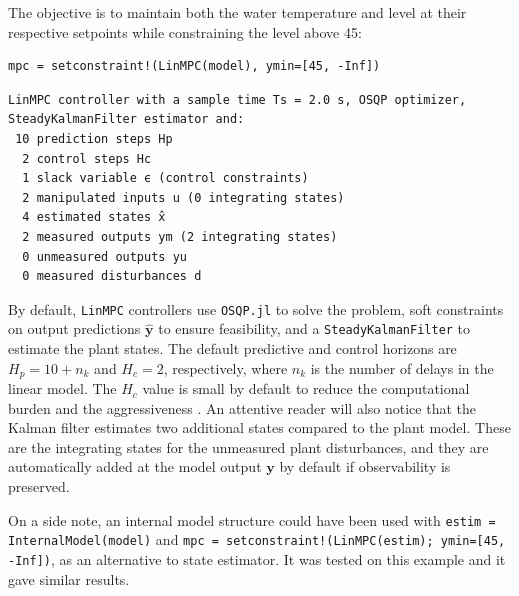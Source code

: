The objective is to maintain both the water temperature and level at their respective setpoints while constraining the level above 45:
\begin{verbatim}
mpc = setconstraint!(LinMPC(model), ymin=[45, -Inf])
\end{verbatim}
\spacerepl
\begin{verbatim}
LinMPC controller with a sample time Ts = 2.0 s, OSQP optimizer, SteadyKalmanFilter estimator and:
 10 prediction steps Hp
  2 control steps Hc
  1 slack variable ϵ (control constraints)
  2 manipulated inputs u (0 integrating states)
  4 estimated states x̂
  2 measured outputs ym (2 integrating states)
  0 unmeasured outputs yu
  0 measured disturbances d
\end{verbatim}
By default, \texttt{LinMPC} controllers use \texttt{OSQP.jl} \citep{osqp} to solve the problem, soft constraints on output predictions $\mathbf{\hat y}$ to ensure feasibility, and a \texttt{SteadyKalmanFilter} to estimate the plant states. The default predictive and control horizons are $H_p = 10 + n_k$ and $H_c = 2$, respectively, where $n_k$ is the number of delays in the linear model. The $H_c$ value is small by default to reduce the computational burden and the aggressiveness \citep{mpcHcAnalysis}. An attentive reader will also notice that the Kalman filter estimates two additional states compared to the plant model. These are the integrating states for the unmeasured plant disturbances, and they are automatically added at the model output $\mathbf{y}$ by default if observability is preserved.

On a side note, an internal model structure could have been used with \texttt{estim = InternalModel(model)} and \texttt{mpc = setconstraint!(LinMPC(estim); ymin=[45, -Inf])}, as an alternative to state estimator. It was tested on this example and it gave similar results.

